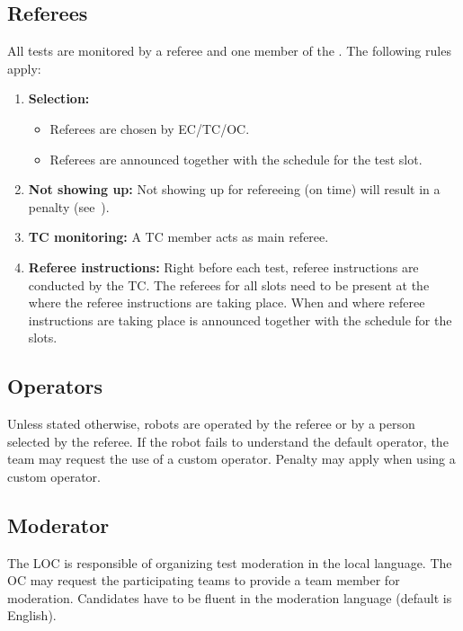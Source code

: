 \subsection{Referees}
\label{rule:referees}
All tests are monitored by a referee and one member of the .
The following rules apply:

\begin{enumerate}
	\item \textbf{Selection:}
	\begin{itemize}
		\item Referees are chosen by EC/TC/OC.
		\item Referees are announced together with the schedule for the test slot.
	\end{itemize}

	\item \textbf{Not showing up:} Not showing up for refereeing (on time) will result in a penalty (see~).

	\item \textbf{TC monitoring:} A TC member acts as main referee.

	\item \textbf{Referee instructions:} Right before each test, referee instructions are conducted by the TC.
	The referees for all slots need to be present at the \Arena{} where the referee instructions are taking place.
	When and where referee instructions are taking place is announced together with the schedule for the slots.
\end{enumerate}


\subsection{Operators}
\label{rule:operator}
Unless stated otherwise, robots are operated by the referee or by a person selected by the referee.
If the robot fails to understand the default operator, the team may request the use of a custom operator.
Penalty may apply when using a custom operator.


\subsection{Moderator}
\label{rule:moderator}
The LOC is responsible of organizing test moderation in the local language.
The OC may request the participating teams to provide a team member for moderation.
Candidates have to be fluent in the moderation language (default is English).

